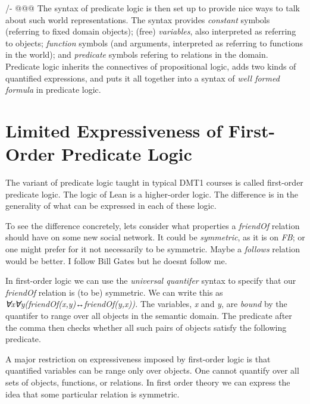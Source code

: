 \documentclass{book}
\begin{document}
/- @@@ The syntax of predicate logic is then set up to provide
nice ways to talk about such world representations. The
syntax provides \emph{constant} symbols (referring to fixed
domain objects); (free) \emph{variables}, also interpreted as
referring to objects; \emph{function} symbols (and arguments,
interpreted as referring to functions in the world); and
\emph{predicate} symbols refering to relations in the domain.
Predicate logic inherits the connectives of propositional
logic, adds two kinds of quantified expressions, and puts
it all together into a syntax of \emph{well formed formula} in
predicate logic.

\hypertarget{pandoc.profile.debug__pandoc__debug__src__predlogic.md__limited-expressiveness-of-first-order-predicate-logic}{%
\section*{Limited Expressiveness of First-Order Predicate Logic}\label{pandoc.profile.debug__pandoc__debug__src__predlogic.md__limited-expressiveness-of-first-order-predicate-logic}}

The variant of predicate logic taught in typical DMT1 courses
is called first-order predicate logic. The logic of Lean is a
higher-order logic. The difference is in the generality of what
can be expressed in each of these logic.

To see the difference concretely, let\textquotesingle s consider what properties
a \emph{friendOf} relation should have on some new social network. It
could be \emph{symmetric}, as it is on \emph{FB}; or one might prefer for
it not necessarily to be symmetric. Maybe a \emph{follows} relation
would be better. I follow Bill Gates but he doesn\textquotesingle t follow me.

In first-order logic we can use the \emph{universal quantifer} syntax
to specify that our \emph{friendOf} relation is (to be) symmetric. We can
write this as \emph{∀x∀y(friendOf(x,y)↔friendOf(y,x)).} The variables,
\emph{x} and \emph{y}, are \emph{bound} by the quantifer to range over all objects
in the semantic domain. The predicate after the comma then checks
whether all such pairs of objects satisfy the following predicate.

A major restriction on expressiveness imposed by first-order logic
is that quantified variables can be range only over objects. One
cannot quantify over all sets of objects, functions, or relations.
In first order theory we can express the idea that some particular
relation is symmetric.
\end{document}
